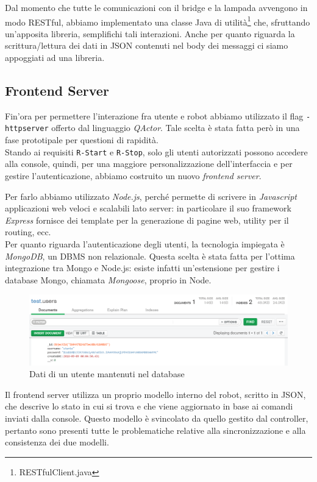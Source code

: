 \documentclass{../llncs}
\newcommand{\codescript}[1]{{\mbox{\small{\texttt{#1}}}}\xspace}
\newcommand{\code}[1]{{\color{blue}\small{\texttt{#1}}}}
\newcommand{\qa}{\textsf{\textit{QActor}}\xspace}
\begin{document}
Dal momento che tutte le comunicazioni con il bridge e la lampada avvengono in modo RESTful, abbiamo implementato una classe Java di utilità\footnote{RESTfulClient.java} che, sfruttando un'apposita libreria, semplifichi tali interazioni.
Anche per quanto riguarda la scrittura/lettura dei dati in JSON contenuti nel body dei messaggi ci siamo appoggiati ad una libreria.

\subsection{Frontend Server}
Fin'ora per permettere l'interazione fra utente e robot abbiamo utilizzato il flag \codescript{-httpserver} offerto dal linguaggio \qa. Tale scelta è stata fatta però in una fase prototipale per questioni di rapidità.\\

Stando ai requisiti \code{R-Start} e \code{R-Stop}, solo gli utenti autorizzati possono accedere alla console, quindi, per una maggiore personalizzazione dell'interfaccia e per gestire l'autenticazione, abbiamo costruito un nuovo \emph{frontend server}.

Per farlo abbiamo utilizzato \emph{Node.js}, perché permette di scrivere in \emph{Javascript} applicazioni web veloci e scalabili lato server: in particolare il suo framework \emph{Express} fornisce dei template per la generazione di pagine web, utility per il routing, ecc.\\

Per quanto riguarda l'autenticazione degli utenti, la tecnologia impiegata è \emph{MongoDB}, un DBMS non relazionale. Questa scelta è stata fatta per l'ottima integrazione tra Mongo e Node.js: esiste infatti un'estensione per gestire i database Mongo, chiamata \emph{Mongoose}, proprio in Node.\\

\begin{figure}
\centering
\includegraphics[scale=0.5]{img/screenFrontend/mongo.png}
\caption{Dati di un utente mantenuti nel database}
\end{figure}

Il frontend server utilizza un proprio modello interno del robot, scritto in JSON, che descrive lo stato in cui si trova e che viene aggiornato in base ai comandi inviati dalla console. Questo modello è svincolato da quello gestito dal controller, pertanto sono presenti tutte le problematiche relative alla sincronizzazione e alla consistenza dei due modelli.\\
\end{document}
